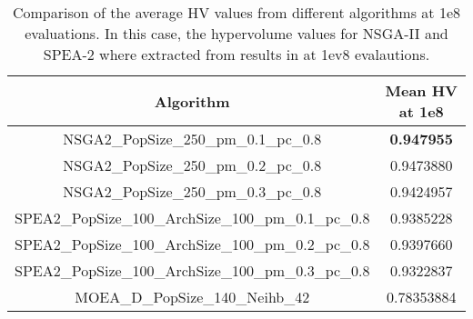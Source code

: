 \begin{table}[H]
\centering
\begin{tabular}{|c|c|}
\hline
\textbf{Algorithm} & \textbf{Mean HV at 1e8} \\ \hline
NSGA2\_PopSize\_250\_pm\_0.1\_pc\_0.8 & \textbf{0.947955} \\ \hline
NSGA2\_PopSize\_250\_pm\_0.2\_pc\_0.8 & 0.9473880 \\ \hline
NSGA2\_PopSize\_250\_pm\_0.3\_pc\_0.8 & 0.9424957 \\ \hline
SPEA2\_PopSize\_100\_ArchSize\_100\_pm\_0.1\_pc\_0.8 & 0.9385228 \\ \hline
SPEA2\_PopSize\_100\_ArchSize\_100\_pm\_0.2\_pc\_0.8 & 0.9397660 \\ \hline
SPEA2\_PopSize\_100\_ArchSize\_100\_pm\_0.3\_pc\_0.8 & 0.9322837 \\ \hline
MOEA\_D\_PopSize\_140\_Neihb\_42 & 0.78353884 \\ \hline
\end{tabular}
\caption{Comparison of the average HV values from different algorithms at 1e8 evaluations. In this case, the hypervolume values for NSGA-II and SPEA-2 where extracted from results in \cite{Miranda2018} at 1ev8 evalautions.}
\label{table:compare}
\end{table}